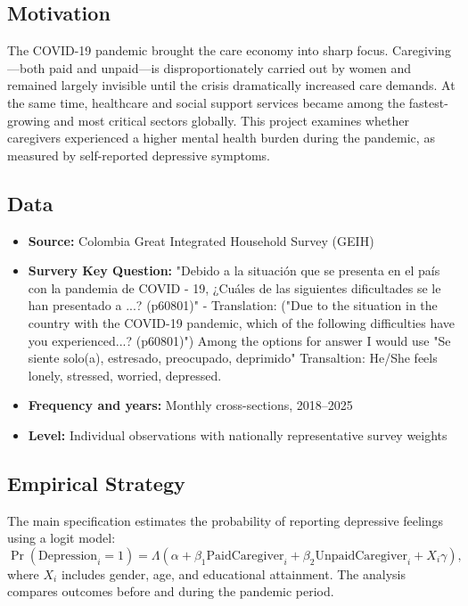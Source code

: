 \documentclass[11pt]{article}
\begin{document}
\subsection*{Motivation}
The COVID-19 pandemic brought the care economy into sharp focus. Caregiving---both paid and unpaid---is disproportionately carried out by women and remained largely invisible until the crisis dramatically increased care demands. At the same time, healthcare and social support services became among the fastest-growing and most critical sectors globally. This project examines whether caregivers experienced a higher mental health burden during the pandemic, as measured by self-reported depressive symptoms.

\subsection*{Data}
\begin{itemize}[leftmargin=*]
  \item \textbf{Source:} Colombia Great Integrated Household Survey (GEIH)
  \item \textbf{Survery Key Question:}  "Debido a la situación que se presenta en el país con la pandemia de COVID - 19, ¿Cuáles de las siguientes dificultades se le han presentado a ...? (p60801)" - Translation: ("Due to the situation in the country with the COVID-19 pandemic, which of the following difficulties have you experienced...? (p60801)") Among the options for answer I would use "Se siente solo(a), estresado, preocupado, deprimido"  Transaltion: He/She feels lonely, stressed, worried, depressed.
  \item \textbf{Frequency and years:} Monthly cross-sections, 2018--2025
  \item \textbf{Level:} Individual observations with nationally representative survey weights
\end{itemize}

\subsection*{Empirical Strategy}
The main specification estimates the probability of reporting depressive feelings using a logit model:
\begin{equation}
\Pr(\text{Depression}_{i}=1) =
\Lambda\left(
\alpha + \beta_1 \text{PaidCaregiver}_{i} + \beta_2 \text{UnpaidCaregiver}_{i} + X_i\gamma
\right),
\end{equation}
where $X_i$ includes gender, age, and educational attainment. The analysis compares outcomes before and during the pandemic period.
\end{document}
